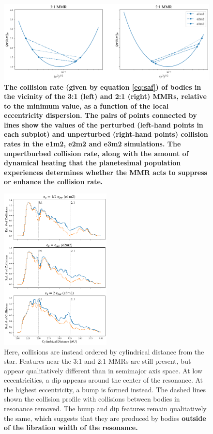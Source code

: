 \documentclass[fleqn,usenatbib]{mnras}
\begin{document}
\begin{figure}
\begin{center}
    \includegraphics[width=\textwidth]{figures/gf_plot.png}
    \caption{\textbf{The collision rate (given by equation \ref{eq:saf}) of bodies in the vicinity of the 3:1 (left) and 2:1 (right) MMRs, relative to the minimum value, as a function of the local 
    eccentricity dispersion. The pairs of points connected by lines show the values of the perturbed (left-hand points in each subplot) and unperturbed (right-hand points) collision rates in 
    the e1m2, e2m2 and e3m2 simulations. The unpertburbed collision rate, along with the amount of dynamical heating that the planetesimal population experiences determines whether 
    the MMR acts to suppress or enhance the collision rate.}\label{fig:gf}}
\end{center}
\end{figure}

\begin{figure}
\begin{center}
    \includegraphics[width=0.5\textwidth]{figures/coll_hist_r.png}
    \caption{Here, collisions are instead ordered by cylindrical distance from the star. Features near the 3:1 and 2:1 MMRs are still present, but appear qualitatively different than in 
    semimajor axis space. At low eccentricities, a dip appears around the center of the resonance. At the highest eccentricity, a bump is formed instead. The dashed lines shown the 
    collision profile with collisions between bodies in resonance removed. The bump and dip features remain qualitatively the same, which suggests that they are produced by bodies 
    \textbf{outside of the libration width of the resonance.}\label{fig:coll_hist_r}}
\end{center}
\end{figure}
\end{document}
